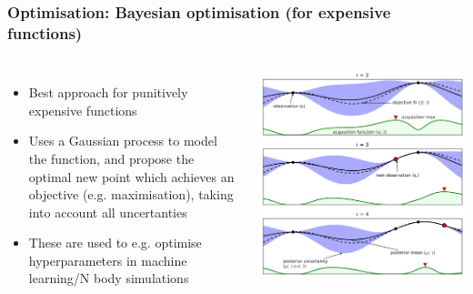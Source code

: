 \documentclass[aspectratio=169]{beamer}
\begin{document}
\begin{frame}
    \frametitle{Optimisation: Bayesian optimisation (for expensive functions)}
    \begin{columns}
        \begin{itemize}
            \item Best approach for punitively expensive functions
            \item Uses a Gaussian process to model the function, and propose the optimal new point which achieves an objective (e.g. maximisation), taking into account all uncertanties
            \item These are used to e.g. optimise hyperparameters in machine learning/N body simulations
        \end{itemize}
        
        \includegraphics[width=\textwidth]{figures/bayesian_optimisation}
    \end{columns}
\end{frame}
\end{document}
